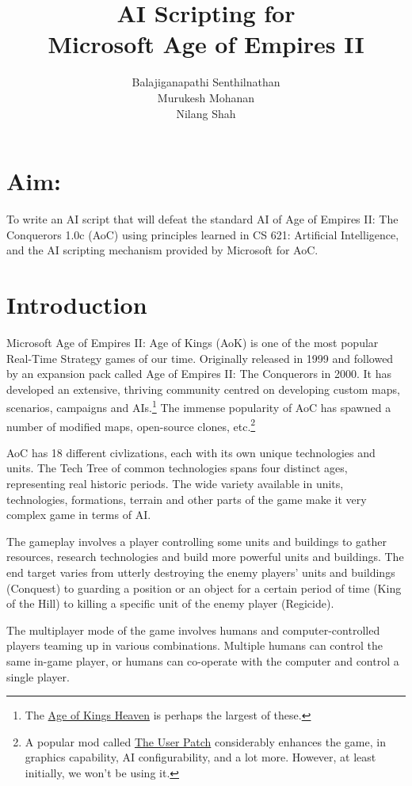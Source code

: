 \documentclass[a4paper,12pt]{article}
\title{AI Scripting for \\Microsoft{\small \texttrademark} Age of Empires II{\small \texttrademark}}
\author{Balajiganapathi Senthilnathan\\Murukesh Mohanan\\Nilang Shah}
\begin{document}
\maketitle

\section*{Aim:}
To write an AI script that will defeat the standard AI of 
Age of Empires II: The Conquerors 1.0c (AoC) using principles learned in 
CS 621: Artificial Intelligence, and the AI scripting mechanism provided 
by Microsoft for AoC.

\section*{Introduction}
Microsoft{\small \texttrademark} Age of Empires II: 
Age of Kings{\small \texttrademark} (AoK) is one of the most popular 
Real-Time Strategy games of our time. Originally released in 1999 and 
followed by an expansion pack called Age of Empires II: 
The Conquerors{\small \texttrademark} in 2000. It has developed an 
extensive, thriving community centred on developing custom maps, 
scenarios, campaigns and AIs.\footnote{The 
\href{http://www.aok.heavengames.com/}{Age of Kings Heaven} is perhaps 
the largest of these.} The immense popularity of 
AoC has spawned a number of modified maps, open-source clones, etc.\footnote{A popular mod called  
\href{http://userpatch.aiscripters.net/}{The User Patch}
considerably enhances the game, in graphics capability, AI  
configurability, and a lot more. However, at least initially, 
we won't be using it.}


AoC has 18 different civlizations, each with its own unique technologies 
and units. The Tech Tree of common technologies spans four distinct ages, 
representing real historic periods.  The wide variety available in units, 
technologies, formations, terrain and other parts of the game make it  
very complex game in terms of AI.

The gameplay involves a player controlling some units and buildings to 
gather resources, research technologies and build more powerful units and 
buildings. The end target varies from utterly destroying the enemy 
players' units and buildings (Conquest) to guarding a position or an 
object for a certain period of time (King of the Hill) to killing a 
specific unit of the enemy player (Regicide). 

The multiplayer mode of the game involves humans and computer-controlled 
players teaming up in various combinations. Multiple humans can control 
the same in-game player, or humans can co-operate with the computer and 
control a single player.
\end{document}
